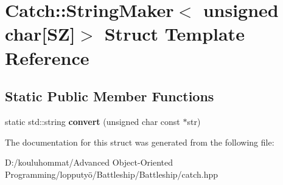 \hypertarget{struct_catch_1_1_string_maker_3_01unsigned_01char[_s_z]_4}{}\section{Catch\+:\+:String\+Maker$<$ unsigned char\mbox{[}SZ\mbox{]}$>$ Struct Template Reference}
\label{struct_catch_1_1_string_maker_3_01unsigned_01char[_s_z]_4}
\subsection*{Static Public Member Functions}
\begin{DoxyCompactItemize}
\item 
\mbox{\label{struct_catch_1_1_string_maker_3_01unsigned_01char[_s_z]_4_a590d64c72b0cc75c113f1eea95d52b66}} 
static std\+::string {\bfseries convert} (unsigned char const $\ast$str)
\end{DoxyCompactItemize}


The documentation for this struct was generated from the following file\+:\begin{DoxyCompactItemize}
\item 
D\+:/kouluhommat/\+Advanced Object-\/\+Oriented Programming/lopputyö/\+Battleship/\+Battleship/catch.\+hpp\end{DoxyCompactItemize}
